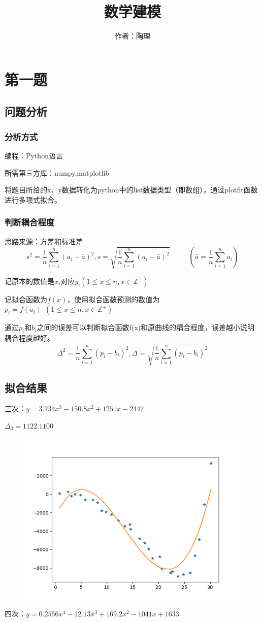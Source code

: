 \documentclass[lang=cn,a4paper]{elegantpaper}
\title{数学建模}
\author{作者：陶理}
\institute{中三（2）班 28号 \\  上海市实验学校}
\date{\zhtoday}
\begin{document}
    \maketitle

    \section{第一题}
    \subsection{问题分析}
    \subsubsection*{分析方式}
    编程：Python语言

    所需第三方库：numpy,matplotlib
    
    将题目所给的x、y数据转化为python中的list数据类型（即数组），通过plotfit函数进行多项式拟合。
    \subsubsection*{判断耦合程度}
    思路来源：方差和标准差
    $$
    s^2=\frac{1}{n}\sum_{i=1}^n (a_i-\bar{a})^2,s=\sqrt{\frac{1}{n}\sum_{i=1}^n (a_i-\bar{a})^2}~~~~~~~~~~~~(\bar{a}=\frac{1}{n}\sum_{i=1}^n a_i)
    $$

    记原本的数值是$x_i$对应$y_i(1\leqslant x\leqslant n,x\in \mathbb{Z}^+)$

    记拟合函数为$f(x)$，使用拟合函数预测的数值为$p_i=f(a_i)~~(1\leqslant x\leqslant n,x\in \mathbb{Z}^+)$
    
    通过$p_i$和$b_i$之间的误差可以判断拟合函数f(x)和原曲线的耦合程度，误差越小说明耦合程度越好。
    $$
    \Delta^2=\frac{1}{n}\sum_{i=1}^n (p_i-b_i)^2, \Delta=\sqrt{\frac{1}{n}\sum_{i=1}^n (p_i-b_i)^2}
    $$
    \subsection{拟合结果}
    三次：$y=3.734x^3-150.8x^2+1251x-2447$

    $\Delta_3=1122.1100$
    \begin{figure}[H]
        \includegraphics[scale=0.4]{1-3.png}
    \end{figure}
    四次：$y=0.2556x^4-12.13x^3+169.2x^2-1041x+1633$
\end{document}
